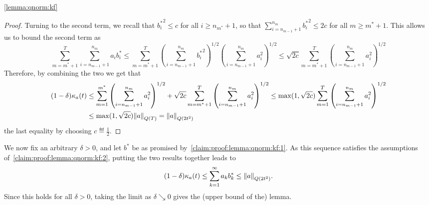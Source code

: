\begin{proofof}{\cref{lemma:qnorm:kf}}
\begin{proof}
  Turning to the second term, we recall that ${b^\ast_i}^2 \leq c$ for all $i \geq n_{m^\ast}+1$, so that $\sum_{i=n_{m-1}+1}^{n_{m}} {b^\ast_i}^2 \leq 2c$ for all $m\geq m^\ast+1$. This allows us to bound the second term as
    \[
        \sum_{m=m^\ast+1}^{T} \sum_{i=n_{m-1}+1}^{n_m} a_i{b^\ast_i} 
        \leq  \sum_{m=m^\ast+1}^{T} \left(\sum_{i=n_{m-1}+1}^{n_{m}} {b^\ast_i}^2\right)^{1/2}\left(\sum_{i=n_{m-1}+1}^{n_{m}} a_i^2\right)^{1/2}
      \leq \sqrt{2c} \sum_{m=m^\ast+1}^{T} \left(\sum_{i=n_{m-1}+1}^{n_{m}} a_i^2\right)^{1/2}
   \]  
  Therefore, by combining the two we get that
  \begin{align*}
      (1-\delta)\kappa_{a}(t) &\leq 
      \sum_{m=1}^{m^\ast} \left( \sum_{i=n_{m-1}+1}^{n_m} a_i^2 \right)^{1/2} + \sqrt{2c} \sum_{m=m^\ast+1}^{T} \left(\sum_{i=n_{m-1}+1}^{n_{m}} a_i^2\right)^{1/2}
      \leq \max(1,\sqrt{2c})  \sum_{m=1}^{T} \left(\sum_{i=n_{m-1}+1}^{n_{m}} a_i^2\right)^{1/2} \\
      &\leq \max(1,\sqrt{2c}) \lVert a{\rVert}_{Q(T)} = \lVert a{\rVert}_{Q(2t^2)}
  \end{align*}
  the last equality by choosing $c\eqdef\frac{1}{2}$.
  \end{proof}
  
  We now fix an arbitrary $\delta > 0$, and let $b^\ast$ be as promised by~\cref{claim:proof:lemma:qnorm:kf:1}. As this sequence satisfies the assumptions of~\cref{claim:proof:lemma:qnorm:kf:2}, putting the two results together leads to
  \[
      (1-\delta)\kappa_{a}(t) \leq \sum_{k=1}^\infty a_kb^\ast_k \leq \lVert a{\rVert}_{Q(2t^2)}.
  \]  
   Since this holds for all $\delta>0$, taking the limit as $\delta\searrow 0$ gives the (upper bound of the) lemma.
\end{proofof}


